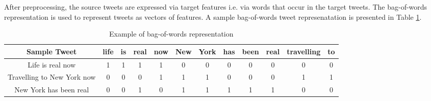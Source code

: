 After preprocessing, the source tweets are expressed via target features i.e. via words that occur in the target tweets. The bag-of-words ~\citep{tom} representation is used to represent tweets as vectors of features. A sample bag-of-words tweet represenatation is presented in Table \ref{sampletweets}.


\begin{table}[ht]
    \begin{center}
    \caption{Example of bag-of-words representation}
    \begin{tabular}[c]{|c|c|c|c|c|c|c|c|c|c|c|c|}
        \hline
        Sample Tweet & life & is & real & now & New & York & has & been & real & travelling & to \\ 
        \hline
        Life is real now & 1 & 1 & 1 & 1 & 0 & 0 & 0 & 0 & 0 & 0 & 0 \\
        Travelling to New York now & 0 & 0 & 0 & 1 & 1 & 1 & 0 & 0 & 0 & 1 & 1 \\
        New York has been real & 0 & 0 & 1 & 0 & 1 & 1 & 1 & 1 & 1 & 0 & 0 \\
        \hline
    \end{tabular}
    \label{sampletweets}
   \end{center}
\end{table}



